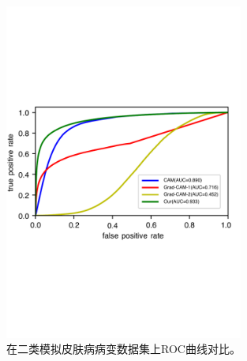 \begin{figure}[H]
	\centering
	\includegraphics[width=0.7\textwidth]{figure/ROC_cam_grad_cam_our_simulated_skin_datasets.pdf}
	\caption[在二类模拟皮肤病病变数据集上ROC曲线对比]{在二类模拟皮肤病病变数据集上ROC曲线对比。}
	\label{fig:roc_cam_grad_cam_our_simulated_skin_datasets}
\end{figure}

